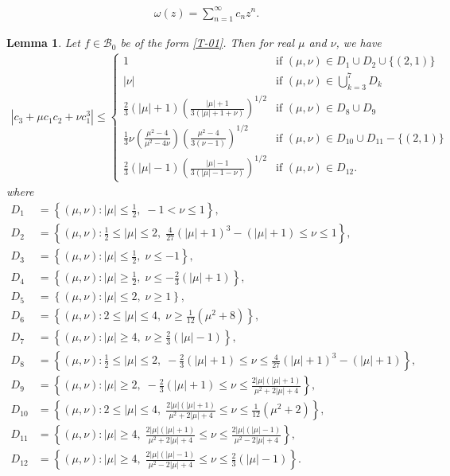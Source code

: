 \documentclass[10pt,a4paper]{amsart}
\newtheorem{lem}{Lemma}
\begin{document}
\begin{align}\label{T-01}
\omega(z)=\sum_{n=1}^\infty c_n z^n.
\end{align}

\begin{lem}\label{T-34}\cite{1981-Prokhorov-szynal}
Let $f\in\mathcal{B}_0$ be of the form \eqref{T-01}. Then for real $\mu$ and $\nu$, we have
\begin{align*}
|c_3+\mu c_1c_2+\nu c_1^3|\le
\begin{cases} 
1 & \text{if } (\mu, \nu) \in D_1 \cup D_2 \cup \{ (2, 1) \} \\
|\nu| & \text{if } (\mu, \nu) \in \bigcup_{k=3}^{7} D_k \\
\frac{2}{3} \left( |\mu| + 1 \right) \left( \frac{|\mu| + 1}{3(|\mu| + 1 +\nu)} \right)^{1/2} & \text{if } (\mu, \nu) \in D_8 \cup D_9 \\
\frac{1}{3} \nu \left( \frac{\mu^2 - 4}{\mu^2 - 4\nu} \right) \left( \frac{\mu^2 - 4}{3(\nu - 1)} \right)^{1/2} & \text{if } (\mu, \nu) \in D_{10} \cup D_{11} - \{ (2, 1) \} \\
\frac{2}{3} \left( |\mu| - 1 \right) \left( \frac{|\mu| - 1}{3(|\mu| - 1 - \nu)} \right)^{1/2} & \text{if } (\mu, \nu) \in D_{12}.
\end{cases}
\end{align*}
where 
\allowdisplaybreaks
\begin{align*}
D_1 &= \left\{ (\mu, \nu): |\mu| \leq \frac{1}{2},\; -1 < \nu \leq 1 \right\}, \\
D_2 &= \left\{ (\mu, \nu): \frac{1}{2} \leq |\mu| \leq 2,\; \frac{4}{27} (|\mu| + 1)^3 - (|\mu| + 1) \leq \nu \leq 1 \right\}, \\
D_3 &= \left\{ (\mu, \nu): |\mu| \leq \frac{1}{2},\; \nu \leq -1 \right\}, \\
D_4 &= \left\{ (\mu, \nu): |\mu| \geq \frac{1}{2},\; \nu \leq -\frac{2}{3} (|\mu| + 1) \right\}, \\
D_5 &= \left\{ (\mu, \nu): |\mu| \leq 2,\; \nu \geq 1 \right\}, \\
D_6 &= \left\{ (\mu, \nu): 2 \leq |\mu| \leq 4,\; \nu \geq \frac{1}{12} (\mu^2 + 8) \right\}, \\
D_7 &= \left\{ (\mu, \nu): |\mu| \geq 4,\; \nu \geq \frac{2}{3} (|\mu| - 1) \right\}, \\
D_8 &= \left\{ (\mu, \nu): \frac{1}{2} \leq |\mu| \leq 2,\; -\frac{2}{3} (|\mu| + 1) \leq \nu \leq \frac{4}{27} (|\mu| + 1)^3 - (|\mu| + 1) \right\}, \\
D_9 &= \left\{ (\mu, \nu): |\mu| \geq 2,\; -\frac{2}{3} (|\mu| + 1) \leq \nu \leq \frac{2|\mu|(|\mu| + 1)}{\mu^2 + 2|\mu| + 4} \right\}, \\
D_{10} &= \left\{ (\mu, \nu): 2 \leq |\mu| \leq 4,\; \frac{2|\mu|(|\mu| + 1)}{\mu^2 + 2|\mu| + 4} \leq \nu \leq \frac{1}{12} (\mu^2 + 2) \right\}, \\
D_{11} &= \left\{ (\mu, \nu): |\mu| \geq 4,\; \frac{2|\mu|(|\mu| + 1)}{\mu^2 + 2|\mu| + 4} \leq \nu \leq \frac{2|\mu|(|\mu| - 1)}{\mu^2 - 2|\mu| + 4} \right\}, \\
D_{12} &= \left\{ (\mu, \nu): |\mu| \geq 4,\; \frac{2|\mu|(|\mu| - 1)}{\mu^2 - 2|\mu| + 4} \leq \nu \leq \frac{2}{3} (|\mu| - 1) \right\}.
\end{align*}


\end{lem}
\end{document}
